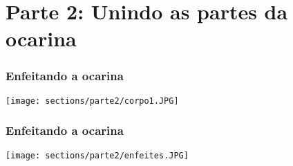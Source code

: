 \section{Parte 2: Unindo as partes da ocarina}

\begin{frame}
\frametitle{Enfeitando a ocarina}
\texttt{[image: sections/parte2/corpo1.JPG]}
\end{frame}

\begin{frame}
\frametitle{Enfeitando a ocarina}
\texttt{[image: sections/parte2/enfeites.JPG]}
\end{frame}
